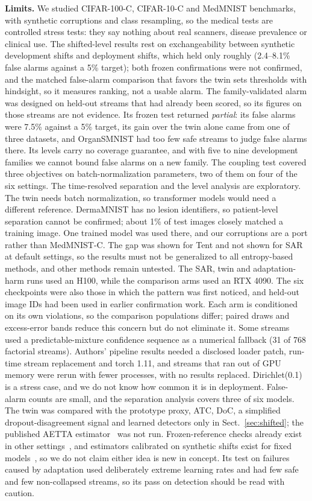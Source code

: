 \documentclass[runningheads]{llncs}
\begin{document}
\textbf{Limits.} We studied CIFAR-100-C, CIFAR-10-C and MedMNIST benchmarks, with synthetic corruptions and class resampling, so the medical tests are controlled stress tests: they say nothing about real scanners, disease prevalence or clinical use. The shifted-level results rest on exchangeability between synthetic development shifts and deployment shifts, which held only roughly (2.4--8.1\% false alarms against a 5\% target); both frozen confirmations were not confirmed, and the matched false-alarm comparison that favors the twin sets thresholds with hindsight, so it measures ranking, not a usable alarm. The family-validated alarm was designed on held-out streams that had already been scored, so its figures on those streams are not evidence. Its frozen test returned \emph{partial}: its false alarms were 7.5\% against a 5\% target, its gain over the twin alone came from one of three datasets, and OrganSMNIST had too few safe streams to judge false alarms there. Its levels carry no coverage guarantee, and with five to nine development families we cannot bound false alarms on a new family. The coupling test covered three objectives on batch-normalization parameters, two of them on four of the six settings. The time-resolved separation and the level analysis are exploratory. The twin needs batch normalization, so transformer models would need a different reference. DermaMNIST has no lesion identifiers, so patient-level separation cannot be confirmed; about 1\% of test images closely matched a training image. One trained model was used there, and our corruptions are a port rather than MedMNIST-C. The gap was shown for Tent and not shown for SAR at default settings, so the results must not be generalized to all entropy-based methods, and other methods remain untested. The SAR, twin and adaptation-harm runs used an H100, while the comparison arms used an RTX 4090. The six checkpoints were also those in which the pattern was first noticed, and held-out image IDs had been used in earlier confirmation work. Each arm is conditioned on its own violations, so the comparison populations differ; paired draws and excess-error bands reduce this concern but do not eliminate it. Some streams used a predictable-mixture confidence sequence as a numerical fallback (31 of 768 factorial streams). Authors' pipeline results needed a disclosed loader patch, run-time stream replacement and torch 1.11, and streams that ran out of GPU memory were rerun with fewer processes, with no results replaced. Dirichlet(0.1) is a stress case, and we do not know how common it is in deployment. False-alarm counts are small, and the separation analysis covers three of six models. The twin was compared with the prototype proxy, ATC, DoC, a simplified dropout-disagreement signal and learned detectors only in Sect.~\ref{sec:shifted}; the published AETTA estimator~\cite{Lee2024AETTA} was not run. Frozen-reference checks already exist in other settings~\cite{Han2026Exchangeability}, and estimators calibrated on synthetic shifts exist for fixed models~\cite{Garg2022ATC,Guillory2021DoC}, so we do not claim either idea is new in concept. Its test on failures caused by adaptation used deliberately extreme learning rates and had few safe and few non-collapsed streams, so its pass on detection should be read with caution.
\end{document}
